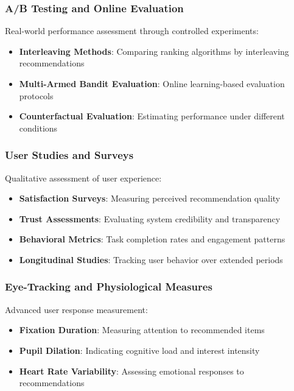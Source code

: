 \subsubsection{A/B Testing and Online Evaluation}

Real-world performance assessment through controlled experiments:

\begin{itemize}
    \item \textbf{Interleaving Methods}: Comparing ranking algorithms by interleaving recommendations
    \item \textbf{Multi-Armed Bandit Evaluation}: Online learning-based evaluation protocols
    \item \textbf{Counterfactual Evaluation}: Estimating performance under different conditions
\end{itemize}

\subsubsection{User Studies and Surveys}

Qualitative assessment of user experience:

\begin{itemize}
    \item \textbf{Satisfaction Surveys}: Measuring perceived recommendation quality
    \item \textbf{Trust Assessments}: Evaluating system credibility and transparency
    \item \textbf{Behavioral Metrics}: Task completion rates and engagement patterns
    \item \textbf{Longitudinal Studies}: Tracking user behavior over extended periods
\end{itemize}

\subsubsection{Eye-Tracking and Physiological Measures}

Advanced user response measurement:

\begin{itemize}
    \item \textbf{Fixation Duration}: Measuring attention to recommended items
    \item \textbf{Pupil Dilation}: Indicating cognitive load and interest intensity
    \item \textbf{Heart Rate Variability}: Assessing emotional responses to recommendations
\end{itemize}

